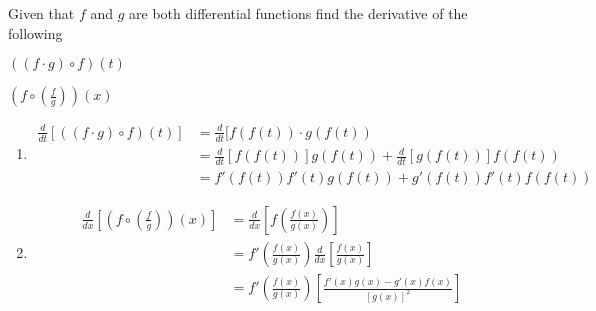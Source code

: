 \documentclass{hwset}
\begin{document}
\begin{problem}[4.]
	Given that $f$ and $g$ are both differential functions find the derivative of
	the following
	\be
		\item $\left((f\cdot g)\circ f\right)(t)$
		\item $\left(f \circ \left(\frac{f}{g}\right)\right)(x)$
	\ee
\end{problem}

\begin{enumerate}
	\item \begin{solution}
		\begin{align*}
			\frac{d}{dt}[((f\cdot g) \circ f)(t)] &= \frac{d}{dt}[f(f(t))\cdot g(f(t)) \\
			&= \frac{d}{dt}[f(f(t))]g(f(t)) + \frac{d}{dt}[g(f(t))]f(f(t)) \\
			&= \boxed{f'(f(t)) f'(t) g(f(t)) + g'(f(t)) f'(t) f(f(t))}
		\end{align*}
	\end{solution}
	\item \begin{solution}
		\begin{align*}
			\frac{d}{dx}\left[\left(f\circ \left(\frac{f}{g}\right)\right)(x)\right] &=
				\frac{d}{dx}\left[f\left(\frac{f(x)}{g(x)}\right)\right] \\
			&= f'\left(\frac{f(x)}{g(x)}\right)
				\frac{d}{dx}\left[\frac{f(x)}{g(x)}\right] \\
			&= \boxed{f'\left(\frac{f(x)}{g(x)}\right)\left[\frac{f'(x)g(x) -
				g'(x)f(x)}{[g(x)]^2}\right]}
		\end{align*}
	\end{solution}
\end{enumerate}
\end{document}
